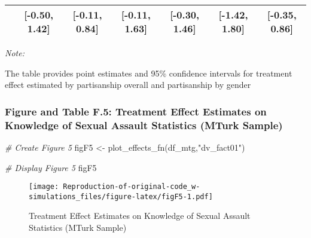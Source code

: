 \documentclass[
]{article}
\newenvironment{Shaded}{\begin{snugshade}}{\end{snugshade}}
\newcommand{\CommentTok}[1]{\textcolor[rgb]{0.56,0.35,0.01}{\textit{#1}}}
\newcommand{\FunctionTok}[1]{\textcolor[rgb]{0.00,0.00,0.00}{#1}}
\newcommand{\NormalTok}[1]{#1}
\newcommand{\OtherTok}[1]{\textcolor[rgb]{0.56,0.35,0.01}{#1}}
\newcommand{\SpecialCharTok}[1]{\textcolor[rgb]{0.00,0.00,0.00}{#1}}
\newcommand{\StringTok}[1]{\textcolor[rgb]{0.31,0.60,0.02}{#1}}
\begin{document}
\begin{table}[H]
\begin{threeparttable}
\begin{tabular}[t]{lcccccc}
\hspace{1em} & {}[-0.50, 1.42] & {}[-0.11, 0.84] & {}[-0.11, 1.63] & {}[-0.30, 1.46] & {}[-1.42, 1.80] & {}[-0.35, 0.86]\\
\bottomrule
\end{tabular}
\begin{tablenotes}
\small
\item \textit{Note: } 
\item The table provides point estimates and 95\% confidence intervals for treatment effect estimated by partisanship overall and partisanship by gender
\end{tablenotes}
\end{threeparttable}
\end{table}

\hypertarget{figure-and-table-f.5-treatment-effect-estimates-on-knowledge-of-sexual-assault-statistics-mturk-sample}{%
\subsubsection{Figure and Table F.5: Treatment Effect Estimates on
Knowledge of Sexual Assault Statistics (MTurk
Sample)}\label{figure-and-table-f.5-treatment-effect-estimates-on-knowledge-of-sexual-assault-statistics-mturk-sample}}

\begin{Shaded}
\begin{Highlighting}[]
\CommentTok{\# Create Figure 5}
\NormalTok{figF5 }\OtherTok{\textless{}{-}} \FunctionTok{plot\_effects\_fn}\NormalTok{(df\_mtg,}\StringTok{"dv\_fact01"}\NormalTok{) }

\CommentTok{\# Display Figure 5}
\NormalTok{figF5}
\end{Highlighting}
\end{Shaded}

\begin{figure}
\centering
\texttt{[image: Reproduction-of-original-code\_w-simulations\_files/figure-latex/figF5-1.pdf]}
\caption{Treatment Effect Estimates on Knowledge of Sexual Assault
Statistics (MTurk Sample)}
\end{figure}

\begin{Shaded}
\end{Shaded}
\end{document}
